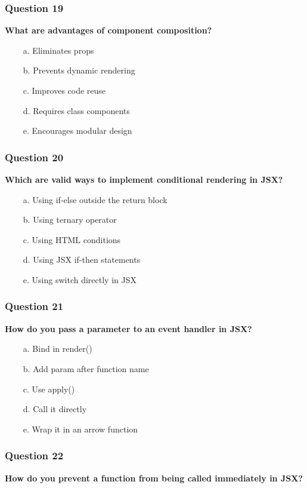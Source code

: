 \documentclass{article}
\newcommand{\cmark}{\textcolor{green}{\ding{51}}} %
\newcommand{\xmark}{\textcolor{red}{\ding{55}}}   %
\begin{document}
\subsubsection*{Question 19}
\textbf{What are advantages of component composition?}

\begin{itemize}
  \item[\xmark\ a.] Eliminates props
  \item[\xmark\ b.] Prevents dynamic rendering
  \item[\cmark\ c.] Improves code reuse
  \item[\xmark\ d.] Requires class components
  \item[\cmark\ e.] Encourages modular design
\end{itemize}

\subsubsection*{Question 20}
\textbf{Which are valid ways to implement conditional rendering in JSX?}

\begin{itemize}
  \item[\cmark\ a.] Using if-else outside the return block
  \item[\cmark\ b.] Using ternary operator
  \item[\xmark\ c.] Using HTML conditions
  \item[\xmark\ d.] Using JSX if-then statements
  \item[\xmark\ e.] Using switch directly in JSX
\end{itemize}

\subsubsection*{Question 21}
\textbf{How do you pass a parameter to an event handler in JSX?}

\begin{itemize}
  \item[\cmark\ a.] Bind in render()
  \item[\xmark\ b.] Add param after function name
  \item[\xmark\ c.] Use apply()
  \item[\xmark\ d.] Call it directly
  \item[\cmark\ e.] Wrap it in an arrow function
\end{itemize}

\subsubsection*{Question 22}
\textbf{How do you prevent a function from being called immediately in JSX?}
\end{document}
